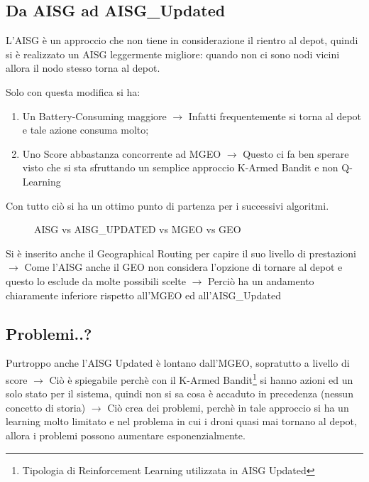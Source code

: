 \documentclass[12pt]{article}
\begin{document}
\subsection{Da AISG ad AISG\_Updated}

L'AISG è un approccio che non tiene in considerazione il rientro al depot, quindi si è realizzato un AISG leggermente migliore: quando non ci sono nodi vicini allora il nodo stesso torna al depot.

Solo con questa modifica si ha:

\begin{enumerate}
    \item Un Battery-Consuming maggiore $\rightarrow$ Infatti frequentemente si torna al depot e tale azione consuma molto;
    
    \item Uno Score abbastanza concorrente ad MGEO $\rightarrow$ Questo ci fa ben sperare visto che si sta sfruttando un semplice approccio K-Armed Bandit e non Q-Learning
\end{enumerate}

Con tutto ciò si ha un ottimo punto di partenza per i successivi algoritmi.

\begin{figure}[H]
    
    \qquad
    \caption{AISG vs AISG\_UPDATED vs MGEO vs GEO}%
    \label{fig:example}%
\end{figure}


Si è inserito anche il Geographical Routing per capire il suo livello di prestazioni $\rightarrow$ Come l'AISG anche il GEO non considera l'opzione di tornare al depot e questo lo esclude da molte possibili scelte $\rightarrow$ Perciò ha un andamento chiaramente inferiore rispetto all'MGEO ed all'AISG\_Updated

\subsection{Problemi..?}

Purtroppo anche l'AISG Updated è lontano dall'MGEO, sopratutto a livello di score $\rightarrow$ Ciò è spiegabile perchè con il K-Armed Bandit\footnote{Tipologia di Reinforcement Learning utilizzata in AISG Updated} si hanno azioni ed un solo stato per il sistema, quindi non si sa cosa è accaduto in precedenza (nessun concetto di storia) $\rightarrow$ Ciò crea dei problemi, perchè in tale approccio si ha un learning molto limitato e nel problema in cui i droni quasi mai tornano al depot, allora i problemi possono aumentare esponenzialmente.
 
\end{document}
